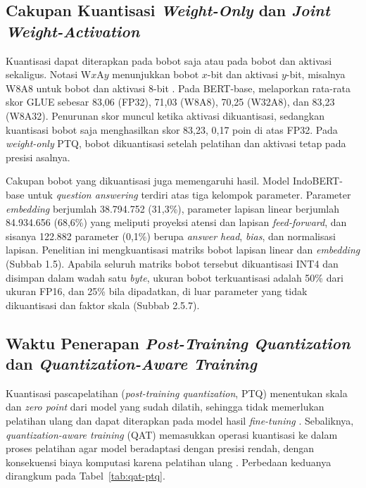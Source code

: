 \subsection{Cakupan Kuantisasi \textit{Weight-Only} dan \textit{Joint Weight-Activation}}

Kuantisasi dapat diterapkan pada bobot saja atau pada bobot dan aktivasi sekaligus. Notasi W$x$A$y$ menunjukkan bobot $x$-bit dan aktivasi $y$-bit, misalnya W8A8 untuk bobot dan aktivasi 8-bit \parencite{bondarenko2021understanding}. Pada BERT-base, \textcite{bondarenko2021understanding} melaporkan rata-rata skor GLUE sebesar 83,06 (FP32), 71,03 (W8A8), 70,25 (W32A8), dan 83,23 (W8A32). Penurunan skor muncul ketika aktivasi dikuantisasi, sedangkan kuantisasi bobot saja menghasilkan skor 83,23, 0,17 poin di atas FP32. Pada \textit{weight-only} PTQ, bobot dikuantisasi setelah pelatihan dan aktivasi tetap pada presisi asalnya.

Cakupan bobot yang dikuantisasi juga memengaruhi hasil. Model IndoBERT-base untuk \textit{question answering} terdiri atas tiga kelompok parameter. Parameter \textit{embedding} berjumlah 38.794.752 (31,3\%), parameter lapisan linear berjumlah 84.934.656 (68,6\%) yang meliputi proyeksi atensi dan lapisan \textit{feed-forward}, dan sisanya 122.882 parameter (0,1\%) berupa \textit{answer head}, \textit{bias}, dan normalisasi lapisan. Penelitian ini mengkuantisasi matriks bobot lapisan linear dan \textit{embedding} (Subbab 1.5). Apabila seluruh matriks bobot tersebut dikuantisasi INT4 dan disimpan dalam wadah satu \textit{byte}, ukuran bobot terkuantisasi adalah 50\% dari ukuran FP16, dan 25\% bila dipadatkan, di luar parameter yang tidak dikuantisasi dan faktor skala (Subbab 2.5.7).

\subsection{Waktu Penerapan \textit{Post-Training Quantization} dan \textit{Quantization-Aware Training}}

Kuantisasi pascapelatihan (\textit{post-training quantization}, PTQ) menentukan skala dan \textit{zero point} dari model yang sudah dilatih, sehingga tidak memerlukan pelatihan ulang dan dapat diterapkan pada model hasil \textit{fine-tuning} \parencite{gholami2021survey}. Sebaliknya, \textit{quantization-aware training} (QAT) memasukkan operasi kuantisasi ke dalam proses pelatihan agar model beradaptasi dengan presisi rendah, dengan konsekuensi biaya komputasi karena pelatihan ulang \parencite{gholami2021survey}. Perbedaan keduanya dirangkum pada Tabel~\ref{tab:qat-ptq}.


